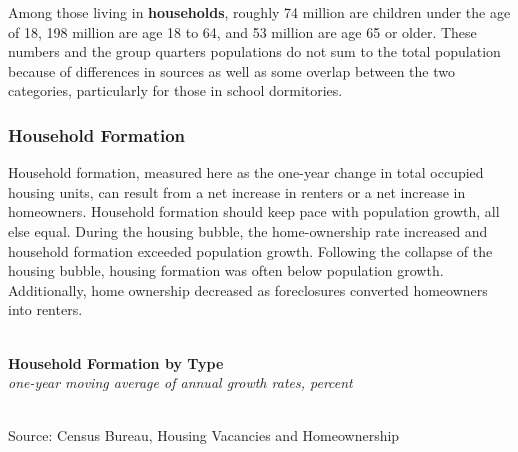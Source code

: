 \documentclass{report}
\makeatletter
\newcommand{\tbllink}[1]{\href{https://raw.githubusercontent.com/bdecon/US-chartbook/master/chartbook/data/#1}{\faTable}}
\newcommand*\short[1]{\expandafter\@gobbletwo\number\numexpr#1\relax}
\newcommand{\sbar}[4]{
		\addplot[ybar stacked, bar width=2.6pt, draw opacity=0, fill=#1] 
			table [x=#2, y=#3, col sep=comma]{#4};}
\newcommand{\stdnode}[3]{\node[below, align=left, shift=({#1,#2})]{#3};}
\newcommand{\dateaxisticks}{
		date coordinates in=x, axis line style={draw=none},
		xmax={2020-05-10},
		max space between ticks=40,	    
		xtick={{1990-01-01}, {1992-01-01}, {1994-01-01}, 
			{1996-01-01}, {1998-01-01}, {2000-01-01}, 
			{2002-01-01}, {2004-01-01}, {2006-01-01},
			{2008-01-01}, {2010-01-01}, {2012-01-01}, {2014-01-01},
		    {2016-01-01}, {2018-01-01}, {2020-01-01}},
		minor xtick={{1989-01-01}, {1991-01-01}, {1993-01-01},
			{1995-01-01}, {1997-01-01}, {1999-01-01}, 
			{2001-01-01}, {2003-01-01}, {2005-01-01}, {2007-01-01},
		    {2009-01-01}, {2011-01-01}, {2013-01-01}, {2015-01-01},
		    {2017-01-01}, {2019-01-01}},
		enlarge y limits={0.06}, enlarge x limits={0.01},
		}
\newcommand{\bbar}[2]{extra #1 ticks = {{#2}}, extra #1 tick labels = ,
		extra #1 tick style = {grid=major, grid style={thick, black!25}},}
\newcommand{\stdline}[4]{\addplot[very thick, no markers, color=#1] 
		table [x=#2, y=#3, col sep=comma] {#4};	}
\newcommand{\rbars}{
		\fill[color=black!10] (axis cs:{1990-07-01},\pgfkeysvalueof{/pgfplots/ymin}) rectangle 
			(axis cs:{1991-03-01}, \pgfkeysvalueof{/pgfplots/ymax});
		\fill[color=black!10] (axis cs:{2007-12-01},\pgfkeysvalueof{/pgfplots/ymin}) rectangle 
			(axis cs:{2009-07-01}, \pgfkeysvalueof{/pgfplots/ymax});
		\fill[color=black!10] (axis cs:{2001-03-01},\pgfkeysvalueof{/pgfplots/ymin}) rectangle 
			(axis cs:{2001-11-01}, \pgfkeysvalueof{/pgfplots/ymax});}
\makeatother
\begin{document}
{{{\begin{minipage}{0.76\textwidth}
Among those living in \textbf{households}, roughly 74 million are children under the age of 18, 198 million are age 18 to 64, and 53 million are age 65 or older. These numbers and the group quarters populations do not sum to the total population because of differences in sources as well as some overlap between the two categories, particularly for those in school dormitories. \\

\end{minipage}

\newpage

\subsubsection*{\color{black!70} \seriffont Household Formation}

\begin{minipage}{0.76\textwidth}

\small Household formation, measured here as the one-year change in total occupied housing units, can result from a net increase in renters or a net increase in homeowners. Household formation should keep pace with population growth, all else equal. During the housing bubble, the home-ownership rate increased and household formation exceeded population growth. Following the collapse of the housing bubble, housing formation was often below population growth. Additionally, home ownership decreased as foreclosures converted homeowners into renters. \\

\\

\vspace{2mm}

\noindent \normalsize \textbf{Household Formation by Type}\\
\footnotesize{\textit{one-year moving average of annual growth rates, percent}}\\
\noindent \hspace*{-2mm} \\
\footnotesize{Source: Census Bureau, Housing Vacancies and Homeownership}  \hfill \tbllink{hhform.csv}


\end{minipage}}}}
\end{document}
